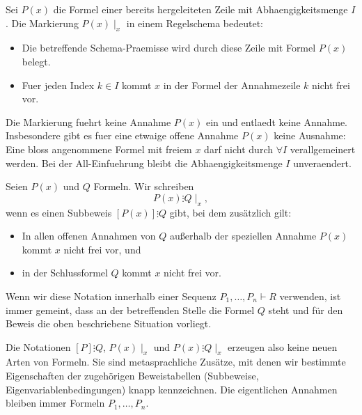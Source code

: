 \documentclass[main.tex]{subfiles}
\begin{document}
\begin{definition}
Sei \(P(x)\) die Formel einer bereits hergeleiteten Zeile mit
Abhaengigkeitsmenge \(I\). Die Markierung \(P(x)\mid_x\) in einem
Regelschema bedeutet:
\begin{itemize}
  \item Die betreffende Schema-Praemisse wird durch diese Zeile
        mit Formel \(P(x)\) belegt.
  \item Fuer jeden Index \(k\in I\) kommt \(x\) in der Formel der
        Annahmezeile \(k\) nicht frei vor.
\end{itemize}
Die Markierung fuehrt keine Annahme \(P(x)\) ein und entlaedt
keine Annahme. Insbesondere gibt es fuer eine etwaige offene
Annahme \(P(x)\) keine Ausnahme: Eine bloss angenommene Formel
mit freiem \(x\) darf nicht durch \(\forall I\) verallgemeinert
werden. Bei der All-Einfuehrung bleibt die Abhaengigkeitsmenge
\(I\) unveraendert.
\end{definition}

\begin{definition}
Seien \(P(x)\) und \(Q\) Formeln. Wir schreiben
\[
  P(x)\vdots Q\mid_x,
\]
wenn es einen Subbeweis \([P(x)]\vdots Q\) gibt, bei dem zusätzlich gilt:
\begin{itemize}
  \item In allen offenen Annahmen von \(Q\) außerhalb der speziellen Annahme
        \(P(x)\) kommt \(x\) nicht frei vor, und
  \item in der Schlussformel \(Q\) kommt \(x\) nicht frei vor.
\end{itemize}
Wenn wir diese Notation innerhalb einer Sequenz \(P_1,\dots,P_n \vdash R\)
verwenden, ist immer gemeint, dass an der betreffenden Stelle die Formel
\(Q\) steht und für den Beweis die oben beschriebene Situation vorliegt.
\end{definition}

\begin{remark}
Die Notationen \([P]\vdots Q\), \(P(x)\mid_x\) und \(P(x)\vdots Q\mid_x\)
erzeugen also keine neuen Arten von Formeln. Sie sind metasprachliche
Zusätze, mit denen wir bestimmte Eigenschaften der zugehörigen
Beweistabellen (Subbeweise, Eigenvariablenbedingungen) knapp
kennzeichnen. Die eigentlichen Annahmen bleiben immer Formeln
\(P_1,\dots,P_n\).
\end{remark}

\end{document}
